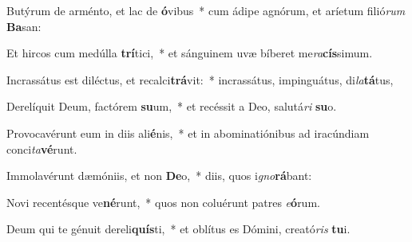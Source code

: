 \item Butýrum de arménto, et lac de \textbf{ó}vibus~* cum ádipe agnórum, et aríetum filió\textit{rum} \textbf{Ba}san:
\item Et hircos cum medúlla \textbf{trí}tici,~* et sánguinem uvæ bíberet me\textit{ra}\textbf{cís}simum.
\item Incrassátus est diléctus, et recalci\textbf{trá}vit:~* incrassátus, impinguátus, di\textit{la}\textbf{tá}tus,
\item Derelíquit Deum, factórem \textbf{su}um,~* et recéssit a Deo, salutá\textit{ri} \textbf{su}o.
\item Provocavérunt eum in diis ali\textbf{é}nis,~* et in abominatiónibus ad iracúndiam conci\textit{ta}\textbf{vé}runt.
\item Immolavérunt dæmóniis, et non \textbf{De}o,~* diis, quos i\textit{gno}\textbf{rá}bant:
\item Novi recentésque ve\textbf{né}runt,~* quos non coluérunt patres \textit{e}\textbf{ó}rum.
\item Deum qui te génuit dereli\textbf{quís}ti,~* et oblítus es Dómini, creató\textit{ris} \textbf{tu}i.
